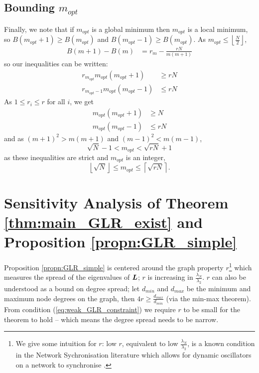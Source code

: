 \subsection{Bounding $m_{opt}$}
Finally, we note that if $m_{opt}$ is a global minimum then $m_{opt}$ is a local minimum, so
$B(m_{opt} + 1) \geq B(m_{opt})$ and $B(m_{opt} - 1) \geq B(m_{opt})$. As $m_{opt} \leq \left\lfloor\frac{N}{2}\right\rfloor$,
\begin{align}
    B(m+1) - B(m) &= r_{m} - \frac{rN}{m(m+1)}
\end{align}
so our inequalities can be written:
\begin{align}
     r_{m_{opt}} m_{opt}(m_{opt} + 1)&\geq rN \\
    r_{m_{opt}-1}m_{opt}(m_{opt} - 1) &\leq rN
\end{align}
As $1 \leq r_{i} \leq r$ for all $i$, we get
\begin{align}
    m_{opt}(m_{opt} + 1)&\geq N  \\
    m_{opt}(m_{opt} - 1) &\leq rN 
\end{align}
and as $(m+1)^{2} > m(m+1)$ and $(m-1)^{2} < m(m-1)$,
\begin{equation}
    \sqrt{N} - 1 < m_{opt} < \sqrt{rN} + 1
\end{equation}
as these inequalities are strict and $m_{opt}$ is an integer,
\begin{equation}
\left\lfloor\sqrt{N}\right\rfloor \leq m_{opt} \leq \left\lceil\sqrt{rN}\right\rceil.
\end{equation}
\fi

\section{Sensitivity Analysis of Theorem \ref{thm:main_GLR_exist} and Proposition \ref{propn:GLR_simple}}
\label{app:GLR_sensitivity}

Proposition \ref{propn:GLR_simple} is centered around the graph property $r$\footnote{We give some intuition for $r$: low $r$, equivalent to low $\frac{\lambda_{N}}{\lambda_{2}}$, is a known condition in the Network Sychronisation literature which allows for dynamic oscillators on a network to synchronise \cite{barahona2002synchronization}.} which measures the spread of the eigenvalues of $\bm{L}$; $r$ is increasing in $\frac{\lambda_{N}}{\lambda_{2}}$. $r$ can also be understood as a bound on degree spread; let $d_{min}$ and $d_{max}$ be the minimum and maximum node degrees on the graph, then $4r \geq \frac{d_{max}}{{d_{min}}}$ (via the min-max theorem).
From condition (\ref{eq:weak_GLR_constraint}) we require $r$ to be small for the theorem to hold -- which means the degree spread needs to be narrow. %

